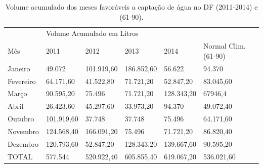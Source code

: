 \begin{table}[h]
\centering
\caption{Volume acumulado dos meses favoráveis a captação de água no DF (2011-2014) e (61-90).}
\label{Volume acumulado dos meses favoráveis a captação de água no DF (2011-2014) e (61-90).}
\begin{tabular}{llllll}
 &  &  &  &  &  \\ \hline
\multicolumn{1}{|l|}{} & \multicolumn{5}{l|}{Volume Acumulado em Litros} \\ \hline
\multicolumn{1}{|l|}{Mês} & \multicolumn{1}{l|}{2011} & \multicolumn{1}{l|}{2012} & \multicolumn{1}{l|}{2013} & \multicolumn{1}{l|}{2014} & \multicolumn{1}{l|}{Normal Clim. (61-90)} \\ \hline
\multicolumn{1}{|l|}{Janeiro} & \multicolumn{1}{l|}{49.072} & \multicolumn{1}{l|}{101.919,60} & \multicolumn{1}{l|}{186.852,60} & \multicolumn{1}{l|}{56.622} & \multicolumn{1}{l|}{94.370} \\ \hline
\multicolumn{1}{|l|}{Fevereiro} & \multicolumn{1}{l|}{64.171,60} & \multicolumn{1}{l|}{41.522,80} & \multicolumn{1}{l|}{71.721,20} & \multicolumn{1}{l|}{52.847,20} & \multicolumn{1}{l|}{83.045,60} \\ \hline
\multicolumn{1}{|l|}{Março} & \multicolumn{1}{l|}{90.595,20} & \multicolumn{1}{l|}{75.496} & \multicolumn{1}{l|}{71.721,20} & \multicolumn{1}{l|}{128.343,20} & \multicolumn{1}{l|}{67946,4} \\ \hline
\multicolumn{1}{|l|}{Abril} & \multicolumn{1}{l|}{26.423,60} & \multicolumn{1}{l|}{45.297,60} & \multicolumn{1}{l|}{33.973,20} & \multicolumn{1}{l|}{94.370} & \multicolumn{1}{l|}{49.072,40} \\ \hline
\multicolumn{1}{|l|}{Outubro} & \multicolumn{1}{l|}{101.919,60} & \multicolumn{1}{l|}{37.748} & \multicolumn{1}{l|}{37.748} & \multicolumn{1}{l|}{75.496} & \multicolumn{1}{l|}{64.171,60} \\ \hline
\multicolumn{1}{|l|}{Novembro} & \multicolumn{1}{l|}{124.568,40} & \multicolumn{1}{l|}{166.091,20} & \multicolumn{1}{l|}{75.496} & \multicolumn{1}{l|}{71.721,20} & \multicolumn{1}{l|}{86.820,40} \\ \hline
\multicolumn{1}{|l|}{Dezembro} & \multicolumn{1}{l|}{120.793,60} & \multicolumn{1}{l|}{52.847,20} & \multicolumn{1}{l|}{128.343,20} & \multicolumn{1}{l|}{139.667,60} & \multicolumn{1}{l|}{90.595,20} \\ \hline
\multicolumn{1}{|l|}{TOTAL} & \multicolumn{1}{l|}{577.544} & \multicolumn{1}{l|}{520.922,40} & \multicolumn{1}{l|}{605.855,40} & \multicolumn{1}{l|}{619.067,20} & \multicolumn{1}{l|}{536.021,60} \\ \hline
\end{tabular}
\end{table}

